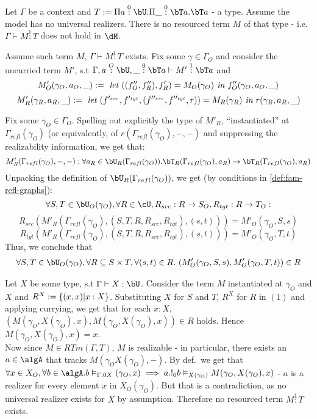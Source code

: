 \documentclass[12pt,a4paper]{article}
\def\src{_{src}}
\def\rfl{_{refl}}
\def\tgt{_{tgt}}
\renewcommand{\O}{_{O}}\alwaysmath{O}
\newcommand{\R}{\ensuremath{_{R}}}
\begin{document}
\begin{thm}
  Let $\Gamma$ be a context and $T \define \Pi a \overset{0}{:} \bU . \Pi \_ \overset{0}{:} \bT a . \bT a$  - a type. Assume the model has no universal realizers. There is no resourced term $M$ of that type - i.e. $\Gamma \vdash M \overset{1}{:} T$ does not hold in $\dM$.
\end{thm}

Assume such term $M$, $\Gamma \vdash M \overset{1}{:} T$ exists. Fix some $\gamma \in \Gamma\O$ and consider the uncurried term $M'$, s.t $\Gamma, a \overset{O}{:} \bU, \_ \overset{0}: \bT a \vdash M' \overset{1}{:} \bT a$ and
$$ M'\O(\gamma\O, a\O, \_) \define \textit{ let } ((f''\O, f''\R) , f'\R)= M\O(\gamma\O) \textit{ in } f''\O(\gamma\O, a\O, \_)$$
$$ M'\R(\gamma\R, a\R, \_) \define \textit{ let } (f'^{\src}, f'^{\tgt}, (f''^{\src}, f''^{\tgt}, r)) = M\R(\gamma\R) \textit{ in } r(\gamma\R, a\R, \_)$$

Fix some $\gamma\O \in \Gamma\O$. Spelling out explicitly the type of $M'\R$, ``instantiated'' at $\Gamma\rfl(\gamma\O)$ (or equivalently, of $r(\Gamma\rfl(\gamma\O), - , -)$ and suppressing the realizability information, we get that:
$$M'\R(\Gamma\rfl(\gamma\O), -, -) : \forall a\R \in \bU\R(\Gamma\rfl(\gamma\O)). \bT\R(\Gamma\rfl(\gamma\O), a\R) \to \bT\R(\Gamma\rfl(\gamma\O), a\R)$$
Unpacking the definition of $\bU\R(\Gamma\rfl(\gamma\O))$, we get (by conditions in \cref{def:fam-refl-graphs}):
$$\forall S, T \in \bU\O(\gamma\O), \forall R \in \cU , R\src : R \to S\O, R\tgt : R \to T\O:$$
$$R\src(M'\R(\Gamma\rfl(\gamma\O),(S,T,R, R\src, R\tgt), (s,t))) = M'\O(\gamma\O, S, s)$$
$$R\tgt(M'\R(\Gamma\rfl(\gamma\O),(S,T,R, R\src, R\tgt),  (s,t))) = M'\O(\gamma\O, T, t)$$
Thus, we conclude that 
\begin{align}
\forall S, T \in \bU\O(\gamma\O), \forall R \subseteq S \times T,  \forall (s,t) \in R.\ (M'\O(\gamma\O, S, s), M'\O(\gamma\O, T, t)) \in R
\end{align}

Let $X$ be some type, s.t $\Gamma \vdash X : \bU$. Consider the term $M$ instantiated at $\gamma\O$ and $X$ and $R^X := \{(x,x) | x : X\}$. Substituting $X$ for $S$ and $T$, $R^X$ for $R$ in $(1)$ and applying currying, we get that for each $x : X$, $(M(\gamma\O, X(\gamma\O), x), M(\gamma\O, X(\gamma\O), x)) \in R$ holds. Hence $M(\gamma\O, X(\gamma\O), x) = x$.\\

Now since $M \in RTm(\Gamma, T)$, $M$ is realizable - in particular, there exists an $a \in \algA$ that tracks $M(\gamma\O X(\gamma\O), -)$. By def.\ we get that $\forall x \in X\O, \forall b \in \algA. b \vDash_{\Gamma.0 X} (\gamma\O, x) \implies a . !_0 b \vDash_{X(\gamma\O)} M(\gamma\O, X(\gamma\O), x)$ - $a$ is a realizer for every element $x$ in $X\O(\gamma\O)$. But that is a contradiction, as no universal realizer exists for $X$ by assumption. Therefore no resourced term $M \overset{1}{:} T$ exists.
\end{document}
